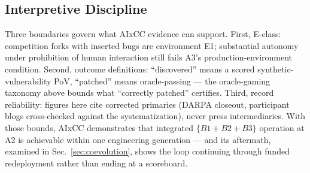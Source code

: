 \subsection{Interpretive Discipline}
Three boundaries govern what AIxCC evidence can support. First, E-class: competition forks with
inserted bugs are environment E1; substantial autonomy under prohibition of human interaction
still fails A3's production-environment condition. Second, outcome definitions: ``discovered''
means a scored synthetic-vulnerability PoV, ``patched'' means oracle-passing --- the oracle-gaming
taxonomy above bounds what ``correctly patched'' certifies. Third, record reliability: figures
here cite corrected primaries (DARPA closeout, participant blogs cross-checked against the
systematization), never press intermediaries. With those bounds, AIxCC demonstrates that
integrated $\{B1{+}B2{+}B3\}$ operation at A2 is achievable within one engineering generation
--- and its aftermath, examined in Sec.~\ref{sec:coevolution}, shows the loop continuing
through funded redeployment rather than ending at a scoreboard.
